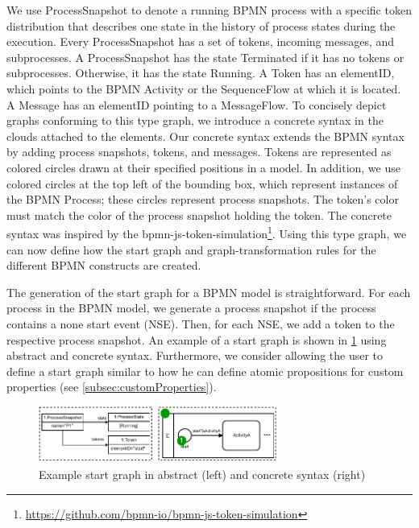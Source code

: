 \documentclass[submission, copyright, creativecommons]{eptcs}
\begin{document}
We use \textsf{ProcessSnapshot} to denote a running BPMN process with a specific token distribution that describes one state in the history of process states during the execution.
Every \textsf{ProcessSnapshot} has a set of \textsf{tokens}, incoming \textsf{messages}, and \textsf{subprocesses}.
A \textsf{ProcessSnapshot} has the state \textsf{Terminated} if it has no \textsf{tokens} or \textsf{subprocesses}.
Otherwise, it has the state \textsf{Running}.
A \textsf{Token} has an \textsf{elementID}, which points to the BPMN \textsf{Activity} or the \textsf{SequenceFlow} at which it is located.
A \textsf{Message} has an \textsf{elementID} pointing to a \textsf{MessageFlow}.
To concisely depict graphs conforming to this type graph, we introduce a concrete syntax in the clouds attached to the elements.
Our concrete syntax extends the BPMN syntax by adding process snapshots, tokens, and messages.
Tokens are represented as colored circles drawn at their specified positions in a model.
In addition, we use colored circles at the top left of the bounding box, which represent instances of the BPMN \textsf{Process}; these circles represent process snapshots.
The token's color must match the color of the process snapshot holding the token.
The concrete syntax was inspired by the bpmn-js-token-simulation\footnote{\url{https://github.com/bpmn-io/bpmn-js-token-simulation}}.
Using this type graph, we can now define how the start graph and graph-transformation rules for the different BPMN constructs are created.

The generation of the start graph for a BPMN model is straightforward.
For each process in the BPMN model, we generate a process snapshot if the process contains a none start event (NSE).
Then, for each NSE, we add a token to the respective process snapshot.
An example of a start graph is shown in \cref{fig:startGraph} using abstract and concrete syntax.
Furthermore, we consider allowing the user to define a start graph similar to how he can define atomic propositions for custom properties (see \cref{subsec:customProperties}).

\begin{figure}[h]
    \centering
    \includegraphics[width=0.7\textwidth]{images/startGraph.pdf}
    \caption{Example start graph in abstract (left) and concrete syntax (right)}
    \label{fig:startGraph}
\end{figure}
\end{document}
